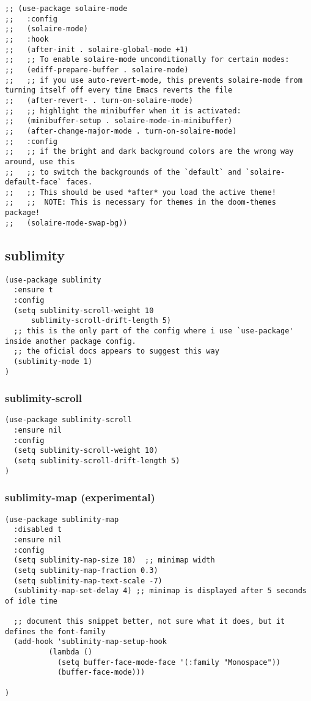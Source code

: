 \documentclass[11pt]{article}
\begin{document}
\begin{verbatim}
;; (use-package solaire-mode
;;   :config
;;   (solaire-mode)
;;   :hook
;;   (after-init . solaire-global-mode +1)
;;   ;; To enable solaire-mode unconditionally for certain modes:
;;   (ediff-prepare-buffer . solaire-mode)
;;   ;; if you use auto-revert-mode, this prevents solaire-mode from turning itself off every time Emacs reverts the file
;;   (after-revert- . turn-on-solaire-mode)
;;   ;; highlight the minibuffer when it is activated:
;;   (minibuffer-setup . solaire-mode-in-minibuffer)
;;   (after-change-major-mode . turn-on-solaire-mode)
;;   :config
;;   ;; if the bright and dark background colors are the wrong way around, use this
;;   ;; to switch the backgrounds of the `default` and `solaire-default-face` faces.
;;   ;; This should be used *after* you load the active theme!
;;   ;;  NOTE: This is necessary for themes in the doom-themes package!
;;   (solaire-mode-swap-bg))
\end{verbatim}

\subsection*{sublimity}
\label{sec:org39bafe7}

\begin{verbatim}
(use-package sublimity
  :ensure t
  :config
  (setq sublimity-scroll-weight 10
      sublimity-scroll-drift-length 5)
  ;; this is the only part of the config where i use `use-package' inside another package config.
  ;; the oficial docs appears to suggest this way
  (sublimity-mode 1)
)
\end{verbatim}

\subsubsection*{sublimity-scroll}
\label{sec:orgc2162f7}
\begin{verbatim}
(use-package sublimity-scroll
  :ensure nil
  :config
  (setq sublimity-scroll-weight 10)
  (setq sublimity-scroll-drift-length 5)
)
\end{verbatim}

\subsubsection*{sublimity-map (experimental)}
\label{sec:orgf9bff82}
\begin{verbatim}
(use-package sublimity-map
  :disabled t
  :ensure nil
  :config
  (setq sublimity-map-size 18)  ;; minimap width
  (setq sublimity-map-fraction 0.3)
  (setq sublimity-map-text-scale -7)
  (sublimity-map-set-delay 4) ;; minimap is displayed after 5 seconds of idle time

  ;; document this snippet better, not sure what it does, but it defines the font-family
  (add-hook 'sublimity-map-setup-hook
          (lambda ()
            (setq buffer-face-mode-face '(:family "Monospace"))
            (buffer-face-mode)))

)
\end{verbatim}
\end{document}
